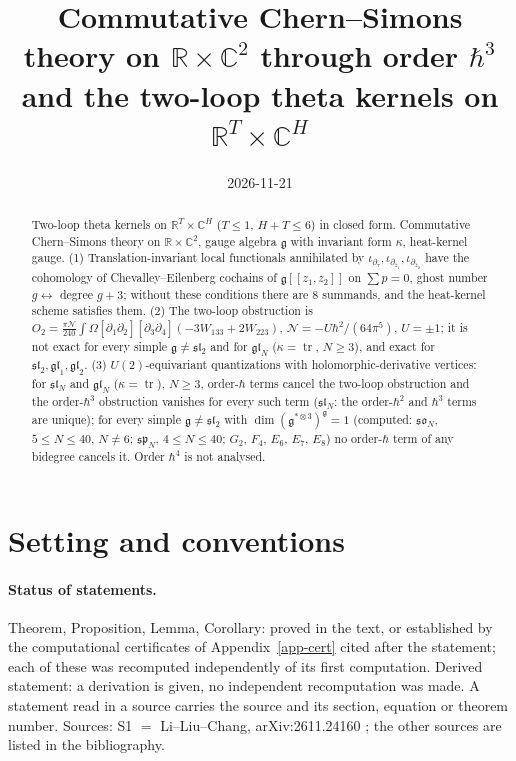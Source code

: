 \documentclass[10pt,a4paper]{article}
\title{Commutative Chern--Simons theory on $\mathbb R\times\mathbb C^2$ through order $\hbar^3$\\ and the two-loop theta kernels on $\mathbb R^T\times\mathbb C^H$}
\author{}
\date{2026-11-21}
\numberwithin{equation}{section}
\theoremstyle{definition}
\theoremstyle{remark}
\newcommand{\tr}{\operatorname{tr}}
\newcommand{\g}{\mathfrak g}
\newcommand{\fsl}{\mathfrak{sl}}
\newcommand{\fgl}{\mathfrak{gl}}
\newcommand{\fso}{\mathfrak{so}}
\newcommand{\fsp}{\mathfrak{sp}}
\newcommand{\zb}{\bar z}
\newcommand{\cN}{\mathcal N}
\begin{document}
\maketitle

\begin{abstract}
\noindent Two-loop theta kernels on $\mathbb R^T\times\mathbb C^H$ ($T\le1$, $H+T\le6$) in closed form. Commutative Chern--Simons theory on $\mathbb R\times\mathbb C^2$, gauge algebra $\g$ with invariant form $\kappa$, heat-kernel gauge. (1) Translation-invariant local functionals annihilated by $\iota_{\partial_\tau},\iota_{\partial_{\zb_1}},\iota_{\partial_{\zb_2}}$ have the cohomology of Chevalley--Eilenberg cochains of $\g[[z_1,z_2]]$ on $\sum p=0$, ghost number $g\leftrightarrow$ degree $g+3$; without these conditions there are $8$ summands, and the heat-kernel scheme satisfies them. (2) The two-loop obstruction is $O_2=\frac{\pi\cN}{240}\int\Omega[\partial_1\partial_2][\partial_3\partial_4](-3W_{133}+2W_{223})$, $\cN=-U\hbar^2/(64\pi^5)$, $U=\pm1$; it is not exact for every simple $\g\neq\fsl_2$ and for $\fgl_N$ ($\kappa=\tr$, $N\ge3$), and exact for $\fsl_2,\fgl_1,\fgl_2$. (3) $U(2)$-equivariant quantizations with holomorphic-derivative vertices: for $\fsl_N$ and $\fgl_N$ ($\kappa=\tr$), $N\ge3$, order-$\hbar$ terms cancel the two-loop obstruction and the order-$\hbar^3$ obstruction vanishes for every such term ($\fsl_N$: the order-$\hbar^2$ and $\hbar^3$ terms are unique); for every simple $\g\ne\fsl_2$ with $\dim(\g^{*\otimes3})^\g=1$ (computed: $\fso_N$, $5\le N\le40$, $N\ne6$; $\fsp_N$, $4\le N\le40$; $G_2$, $F_4$, $E_6$, $E_7$, $E_8$) no order-$\hbar$ term of any bidegree cancels it. Order $\hbar^4$ is not analysed.
\end{abstract}

\tableofcontents

\section{Setting and conventions}\label{sec-setting}

\paragraph{Status of statements.} Theorem, Proposition, Lemma, Corollary: proved in the text, or established by the computational certificates of Appendix~\ref{app-cert} cited after the statement; each of these was recomputed independently of its first computation. Derived statement: a derivation is given, no independent recomputation was made. A statement read in a source carries the source and its section, equation or theorem number. Sources: S1 $=$ Li--Liu--Chang, arXiv:2611.24160 \cite{S1}; the other sources are listed in the bibliography.
\end{document}
